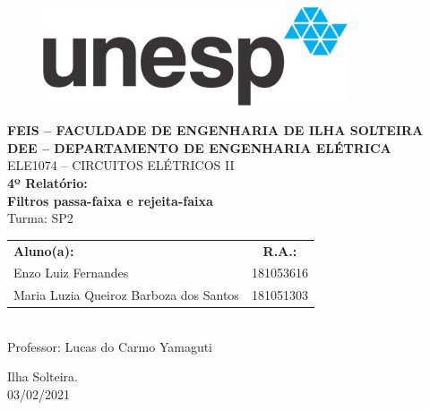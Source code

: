 \begin{titlepage}
	\begin{center} %
		{\begin{figure}[ht]
				\centering
				\includegraphics[width=9cm]{imagens/logoUNESP.jpg}
			\end{figure}}
		{\bf \large FEIS – FACULDADE DE ENGENHARIA DE ILHA SOLTEIRA}\\[0.2cm] %
		{\bf \large DEE – DEPARTAMENTO DE ENGENHARIA ELÉTRICA}\\[3.5cm]

		{\large ELE1074 – CIRCUITOS ELÉTRICOS II}\\[4.1cm]

		{\bf \huge 4º Relatório:}\\[0.2cm] %

		{\bf \huge Filtros passa-faixa e rejeita-faixa}\\[4.1cm]

		{\large Turma: SP2}\\[0.5cm]

		{\begin{tabular}{l c}
			\large\textbf{Aluno(a):}                      & \large\textbf{R.A.:}
			\\
			\Large Enzo Luiz Fernandes                    & \large 181053616     \\
			\Large Maria Luzia Queiroz Barboza dos Santos & \large 181051303
			\\
		\end{tabular}}\\[1cm]

		{\large Professor: Lucas do Carmo Yamaguti}\\[1.1cm]

	\end{center} %



	\begin{center}
		{\large Ilha Solteira.}\\[0.2cm]

		{\large 03/02/2021}

	\end{center}
\end{titlepage}
